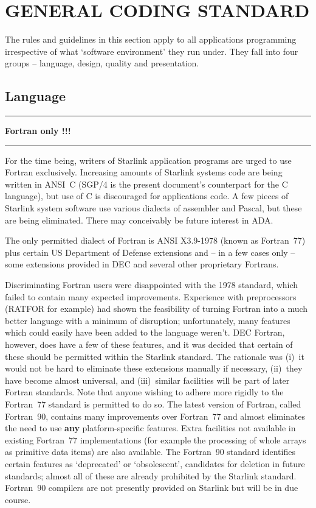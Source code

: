 \documentclass[twoside,11pt,nolof,noabs]{starlink}
\newcounter{sruleno}
\providecommand{\srule}[1]{
    \addtocounter{sruleno}{1}
    \goodbreak
    \rule{\textwidth}{0.3mm}
    \textbf{#1} \scpushright{ \textbf{\thesruleno}}
    \rule{\textwidth}{0.1mm}
}
\renewcommand{\_}{{\tt\char'137}}
\begin{document}
\newpage
\section{GENERAL CODING STANDARD}

The rules and guidelines in this section apply to all applications programming
irrespective of what `software environment' they run under.
They fall into four groups -- language, design, quality and
presentation.

\goodbreak
\subsection{Language}

\srule{Fortran only !!!}
For the time being, writers of Starlink application programs are
urged to use Fortran exclusively.  Increasing amounts of Starlink
systems code are being written in ANSI~C (SGP/4 is the present document's
counterpart for the C language), but use of C is discouraged for
applications code.  A few pieces of Starlink system software use
various dialects of assembler and Pascal, but these are being
eliminated.  There may conceivably be future interest in ADA.

The only permitted dialect of Fortran
is ANSI X3.9-1978 (known as Fortran~77) plus certain
US Department of Defense extensions and -- in a few cases only -- some
extensions provided in DEC and several other proprietary Fortrans.

Discriminating Fortran users were disappointed with the 1978 standard, which
failed to contain many expected improvements.
Experience with preprocessors (RATFOR for example) had shown the feasibility of
turning Fortran into a much better language with a minimum of disruption;
unfortunately, many features which could easily have been added to the language
weren't.  DEC Fortran, however, does have a few of these features, and it
was decided that certain of these should be permitted within the Starlink
standard.  The rationale was
(i)~it would not be hard to eliminate these extensions manually if necessary,
(ii)~they have become almost universal, and
(iii)~similar facilities will be part of later Fortran standards.
Note that anyone wishing to adhere more rigidly to the Fortran~77 standard is
permitted to do so.
The latest version of Fortran, called Fortran~90, contains
many improvements over Fortran~77 and almost eliminates the need to
use \textbf{any} platform-specific features.  Extra facilities not
available in existing Fortran~77 implementations (for example the
processing of whole arrays
as primitive data items) are also available.
The Fortran~90 standard identifies certain features as `deprecated'
or `obsolescent', candidates for deletion in future standards;
almost all of these are already prohibited by the Starlink standard.
Fortran~90 compilers are not presently provided on Starlink but
will be in due course.
\end{document}

